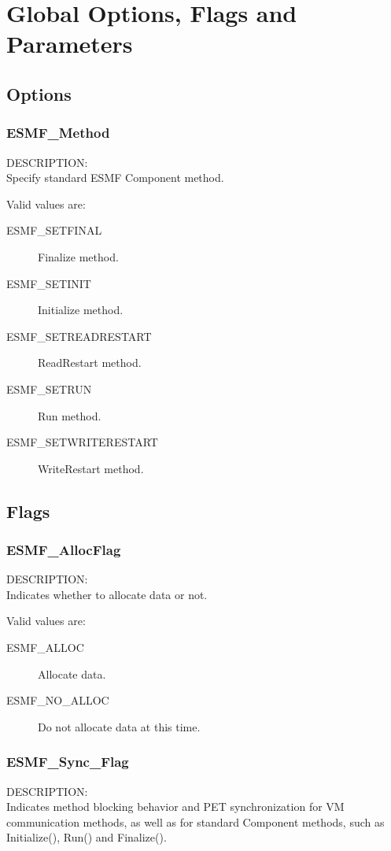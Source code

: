 
\section{Global Options, Flags and Parameters}

\subsection{Options}

\subsubsection{ESMF\_Method}
\label{opt:method}
{\sf DESCRIPTION:\\}  
Specify standard ESMF Component method.

Valid values are:
\begin{description}
\item [ESMF\_SETFINAL]
      Finalize method.
\item [ESMF\_SETINIT]
      Initialize method.
\item [ESMF\_SETREADRESTART]
      ReadRestart method.
\item [ESMF\_SETRUN]
      Run method.
\item [ESMF\_SETWRITERESTART]
      WriteRestart method.
\end{description}


\subsection{Flags}

\subsubsection{ESMF\_AllocFlag}
\label{opt:allocflag}
{\sf DESCRIPTION:\\}  
Indicates whether to allocate data or not.

Valid values are:
\begin{description}
\item [ESMF\_ALLOC]
      Allocate data. 
\item [ESMF\_NO\_ALLOC]
      Do not allocate data at this time. 
\end{description}

\subsubsection{ESMF\_Sync\_Flag}
\label{opt:syncflag}
{\sf DESCRIPTION:\\}  
Indicates method blocking behavior and PET synchronization for VM communication
methods, as well as for standard Component methods, such as Initialize(), Run() 
and Finalize().


